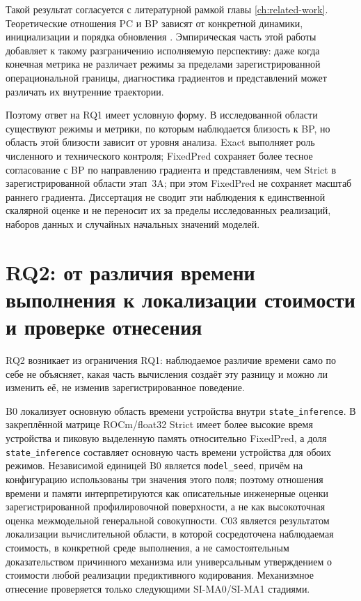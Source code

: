 Такой результат согласуется с литературной рамкой главы
\ref{ch:related-work}. Теоретические отношения PC и BP зависят от конкретной
динамики, инициализации и порядка обновления
\cite{whittington2017approximation,song2020exact,millidge2022arbitrary,
rosenbaum2022relationship,rosenbaum2025correction}. Эмпирическая часть этой
работы добавляет к такому разграничению исполняемую перспективу: даже когда
конечная метрика не различает режимы за пределами зарегистрированной операциональной границы,
диагностика градиентов и представлений может различать их внутренние траектории.

Поэтому ответ на RQ1 имеет условную форму. В исследованной области существуют
режимы и метрики, по которым наблюдается близость к BP, но область этой
близости зависит от уровня анализа. Exact выполняет роль численного и
технического контроля; FixedPred сохраняет более тесное согласование с BP по
направлению градиента и представлениям, чем Strict в зарегистрированной области
этап~3A; при этом FixedPred не сохраняет масштаб раннего градиента. Диссертация
не сводит эти наблюдения к единственной скалярной оценке и не переносит их за
пределы исследованных реализаций, наборов данных и случайных начальных значений
моделей.

\section{RQ2: от различия времени выполнения к локализации стоимости и проверке отнесения}
\label{sec:discussion-rq2}

RQ2 возникает из ограничения RQ1: наблюдаемое различие времени само по себе не
объясняет, какая часть вычисления создаёт эту разницу и можно ли изменить её,
не изменив зарегистрированное поведение.

B0 локализует основную область времени устройства внутри
\texttt{state\_inference}. В закреплённой матрице ROCm/float32 Strict имеет
более высокие время устройства и пиковую выделенную память относительно
FixedPred, а доля \texttt{state\_inference} составляет основную часть времени
устройства для обоих режимов. Независимой единицей B0 является
\texttt{model\_seed}, причём на конфигурацию использованы три значения этого поля; поэтому
отношения времени и памяти интерпретируются как описательные инженерные оценки
зарегистрированной профилировочной поверхности, а не как высокоточная оценка
межмодельной генеральной совокупности. C03 является результатом локализации
вычислительной области, в которой сосредоточена наблюдаемая стоимость, в
конкретной среде выполнения, а не самостоятельным доказательством причинного
механизма или универсальным утверждением о стоимости любой реализации
предиктивного кодирования. Механизмное отнесение проверяется только следующими
SI-MA0/SI-MA1 стадиями.

